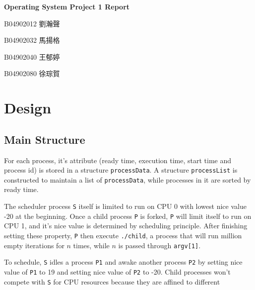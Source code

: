 \documentclass{article}
\begin{document}
\fontsize{12pt}{20pt}\selectfont
\begin{center}
	\bfseries\huge{Operating System Project 1 Report}\\
\end{center}
{
    \hfill B04902012 劉瀚聲

    \hfill B04902032 馬揚格

    \hfill B04902040 王郁婷

    \hfill B04902080 徐琮賀\\
}
\section{Design}
    \subsection*{Main Structure}

        For each process, it's attribute (ready time, execution time, start time and process id) is stored in a structure {\tt processData}.
        A structure {\tt processList} is constructed to maintain a list of {\tt processData}, while processes in it are sorted by ready time.

        The scheduler process {\tt S} itself is limited to run on CPU 0 with lowest nice value -20 at the beginning. Once a child process {\tt P} is forked, {\tt P} will limit itself to run on CPU 1, and it's nice value is determined by scheduling principle. After finishing setting these property, {\tt P} then execute {\tt ./child}, a process that will run million empty iterations for \(n\) times, while \(n\) is passed through {\tt argv[1]}.

        To schedule, {\tt S} idles a process {\tt P1} and awake another process {\tt P2} by setting nice value of {\tt P1}  to 19 and setting nice value of {\tt P2} to -20. Child processes won't compete with {\tt S} for CPU resources because they are affined to different 
        
\end{document}
